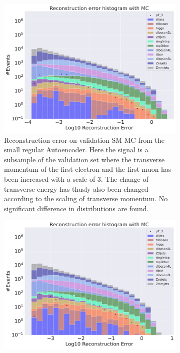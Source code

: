 \begin{figure}[h!]
    \centering
    \begin{subfigure}{.45\textwidth}
        \includegraphics[width=\textwidth]{Figures/AE_testing/small/b_data_recon_big_rm3_feats_sig_pT_3.pdf}
        \caption{Reconstruction error on validation SM MC from the small regular Autoencoder. Here the signal is a subsample of the validation 
        set where the transverse momentum of the first electron and the first muon has been increased with a scale of $3$. The change of transverse 
        energy has thusly also been changed according to the scaling of transverse momentum. No significant difference in distributions are found. }
        \label{fig:ae_small_pt_3}
    \end{subfigure}
    \hfill 
    \begin{subfigure}{.45\textwidth}
        \includegraphics[width=\textwidth]{Figures/AE_testing/big/b_data_recon_big_rm3_feats_sig_pT_3.pdf}

\end{subfigure}
\end{figure}
